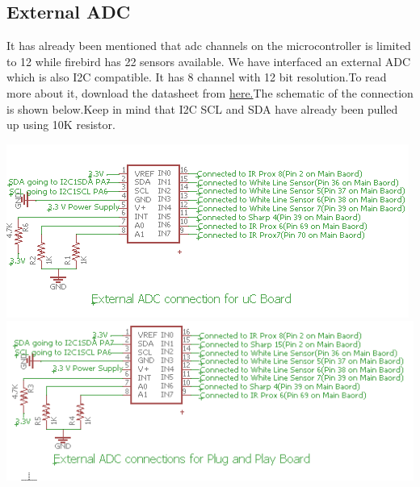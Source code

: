\documentclass[a4paper,10pt,oneside]{article}
\begin{document}
{	\subsection{\huge \textbf{External ADC}}
	{It has already been mentioned that adc channels on the microcontroller is limited to 12 while firebird has 22 sensors available. We have interfaced an external ADC which is also I2C compatible. It has  8 channel with 12 bit resolution.To read more about it, download the datasheet from \href{www.ti.com/lit/pdf/snas483}{here.}The schematic of the connection is shown below.Keep in mind that I2C SCL and SDA have already been pulled up using 10K resistor.\\}
		\begin{center}
		\includegraphics{externaladcuC}\\
		\includegraphics{externalADCplug}\\
	\end{center}
}
\end{document}
